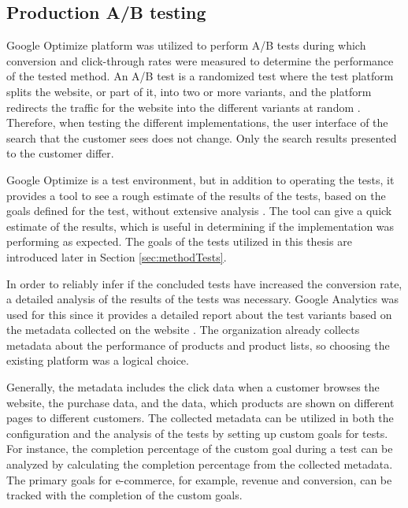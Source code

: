\subsection{Production A/B testing}
\label{ss:abtest}

Google Optimize platform was utilized to perform A/B tests during which conversion and click-through rates were measured
to determine the performance of the tested method.
An A/B test is a randomized test where the test platform splits the website, or part of it, into two or more variants, 
and the platform redirects the traffic for the website into the different variants at random \cite{optimizeAbout}. 
Therefore, when testing the different implementations, the user interface of the search that the customer sees does not change. 
Only the search results presented to the customer differ.


Google Optimize is a test environment, but in addition to operating the tests, 
it provides a tool to see a rough estimate of the results of the tests, 
based on the goals defined for the test, without extensive analysis \cite{optimizeAbout}. 
The tool can give a quick estimate of the results,
which is useful in determining if the implementation was performing as expected. 
The goals of the tests utilized in this thesis are introduced later in Section \ref{sec:methodTests}.


In order to reliably infer if the concluded tests have increased the conversion rate, 
a detailed analysis of the results of the tests was necessary. 
Google Analytics was used for this since it 
provides a detailed report about the test variants based on the metadata collected on the website
\cite{analyticsAbout}.
The organization already collects metadata about the performance of products and product lists, 
so choosing the existing platform was a logical choice.


Generally, the metadata includes the click data when a customer browses the website, the purchase data, 
and the data, which products are shown on different pages to different customers.
The collected metadata can be utilized in both the configuration and the analysis of the tests 
by setting up custom goals for tests. 
For instance, the completion percentage of the custom goal during a test can be analyzed by
calculating the completion percentage from the collected metadata.
The primary goals for e-commerce, for example, revenue and conversion, 
can be tracked with the completion of the custom goals.
\cite{analyticsAbout}
 




